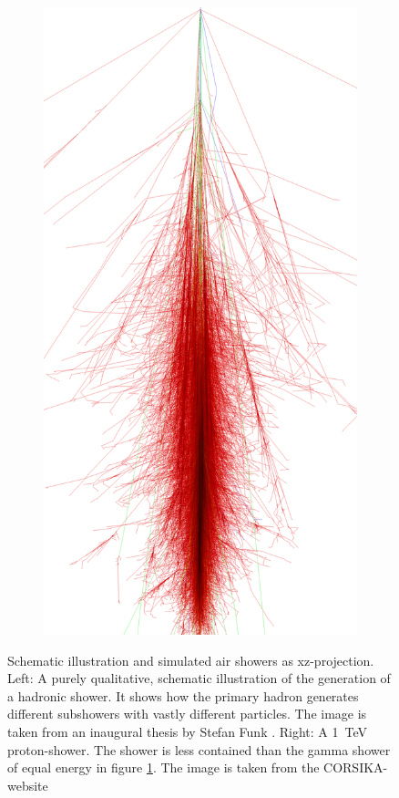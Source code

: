 \begin{figure}
\begin{subfigure}{.3\textwidth}
		\includegraphics[width=.9\linewidth]{images/corsika_1tev_proton.png}
	\end{subfigure}
	\caption{Schematic illustration and simulated air showers as xz-projection.
		Left: A purely qualitative,
		schematic illustration of the generation of a hadronic shower.
		It shows how the primary hadron generates different subshowers
		with vastly different particles.
		The image is taken from an inaugural thesis 
		by Stefan Funk \cite{funk_doctor}.
		Right: A \SI{1}{\tera\electronvolt} proton-shower.
		The shower is less contained than the gamma shower of equal energy in 
		figure \ref{fig:gamma_shower}.
		The image is taken from 
		the CORSIKA-website \cite{corsika_showers}}
	\label{fig:gamma_shower}
\end{figure}

